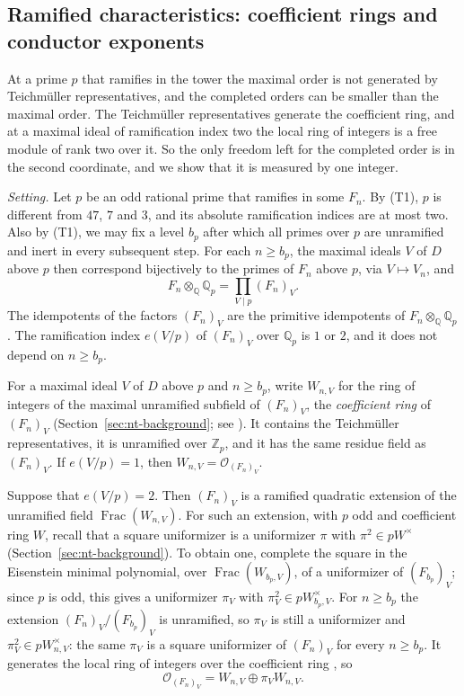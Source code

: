 \documentclass[11pt]{article}
\theoremstyle{plain}
\theoremstyle{definition}
\theoremstyle{remark}
\DeclareMathOperator{\Frac}{Frac}
\newcommand{\Z}{\mathbb Z}
\newcommand{\Q}{\mathbb Q}
\newcommand{\OO}{\mathcal O}
\begin{document}
\subsection{Ramified characteristics: coefficient rings and conductor exponents}
\label{sec:orders-ramified}

At a prime $p$ that ramifies in the tower the maximal order is not
generated by Teichm\"uller representatives, and the completed orders can
be smaller than the maximal order.  The Teichm\"uller representatives
generate the coefficient ring, and at a maximal ideal of ramification
index two the local ring of integers is a free module of rank two over it.  So the only freedom left for the completed order is in
the second coordinate, and we show that it is measured by one integer.

\emph{Setting.}  Let $p$ be an odd rational prime that ramifies in some
$F_n$.  By (T1), $p$ is different from $47$, $7$ and $3$, and its
absolute ramification indices are at most two.  Also by (T1), we may fix
a level $b_p$ after which all primes over $p$ are unramified and inert in
every subsequent step.  For each $n\geq b_p$, the maximal ideals $V$ of
$D$ above $p$ then correspond bijectively to the primes of $F_n$ above
$p$, via $V\mapsto V_n$, and
\[
 F_n\otimes_\Q\Q_p=\prod_{V\mid p}(F_n)_V .
\]
The idempotents of the factors $(F_n)_V$ are the primitive idempotents of
$F_n\otimes_\Q\Q_p$.  The ramification index $e(V/p)$ of $(F_n)_V$ over
$\Q_p$ is $1$ or $2$, and it does not depend on $n\geq b_p$.

For a maximal ideal $V$ of $D$ above $p$ and $n\geq b_p$, write
$W_{n,V}$ for the ring of integers of the maximal unramified subfield of
$(F_n)_V$, the \emph{coefficient ring} of $(F_n)_V$
(Section~\ref{sec:nt-background}; see \cite[Proposition~7.50 and
Corollary~7.51]{MilneANT}).  It contains the Teichm\"uller
representatives, it is unramified over $\Z_p$, and it has the same
residue field as $(F_n)_V$.  If $e(V/p)=1$, then
$W_{n,V}=\OO_{(F_n)_V}$.

Suppose that $e(V/p)=2$.  Then $(F_n)_V$ is a ramified quadratic
extension of the unramified field $\Frac(W_{n,V})$.  For such an
extension, with $p$ odd and coefficient ring $W$, recall that a square
uniformizer is a uniformizer $\pi$ with $\pi^2\in pW^\times$
(Section~\ref{sec:nt-background}).  To
obtain one, complete the square in the Eisenstein minimal polynomial,
over $\Frac(W_{b_p,V})$, of a uniformizer of $(F_{b_p})_V$; since $p$ is
odd, this gives a uniformizer $\pi_V$ with
$\pi_V^2\in pW_{b_p,V}^{\times}$.  For $n\geq b_p$ the extension
$(F_n)_V/(F_{b_p})_V$ is unramified, so $\pi_V$ is still a uniformizer
and $\pi_V^2\in pW_{n,V}^\times$: the same $\pi_V$ is a square
uniformizer of $(F_n)_V$ for every $n\geq b_p$.  It generates the local
ring of integers over the coefficient ring
\cite[Proposition~7.55 and Remark~7.56]{MilneANT}, so
\[
 \OO_{(F_n)_V}=W_{n,V}\oplus\pi_VW_{n,V}.
\]
\end{document}

